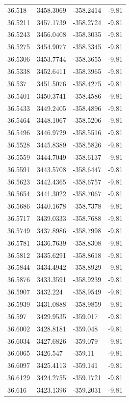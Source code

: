 \begin{table}[H]
\begin{tabular}{llll}
36.518 & 3458.3069 & -358.2414 & -9.81 \\
36.5211 & 3457.1739 & -358.2724 & -9.81 \\
36.5243 & 3456.0408 & -358.3035 & -9.81 \\
36.5275 & 3454.9077 & -358.3345 & -9.81 \\
36.5306 & 3453.7744 & -358.3655 & -9.81 \\
36.5338 & 3452.6411 & -358.3965 & -9.81 \\
36.537 & 3451.5076 & -358.4275 & -9.81 \\
36.5401 & 3450.3741 & -358.4586 & -9.81 \\
36.5433 & 3449.2405 & -358.4896 & -9.81 \\
36.5464 & 3448.1067 & -358.5206 & -9.81 \\
36.5496 & 3446.9729 & -358.5516 & -9.81 \\
36.5528 & 3445.8389 & -358.5826 & -9.81 \\
36.5559 & 3444.7049 & -358.6137 & -9.81 \\
36.5591 & 3443.5708 & -358.6447 & -9.81 \\
36.5623 & 3442.4365 & -358.6757 & -9.81 \\
36.5654 & 3441.3022 & -358.7067 & -9.81 \\
36.5686 & 3440.1678 & -358.7378 & -9.81 \\
36.5717 & 3439.0333 & -358.7688 & -9.81 \\
36.5749 & 3437.8986 & -358.7998 & -9.81 \\
36.5781 & 3436.7639 & -358.8308 & -9.81 \\
36.5812 & 3435.6291 & -358.8618 & -9.81 \\
36.5844 & 3434.4942 & -358.8929 & -9.81 \\
36.5876 & 3433.3591 & -358.9239 & -9.81 \\
36.5907 & 3432.224 & -358.9549 & -9.81 \\
36.5939 & 3431.0888 & -358.9859 & -9.81 \\
36.597 & 3429.9535 & -359.017 & -9.81 \\
36.6002 & 3428.8181 & -359.048 & -9.81 \\
36.6034 & 3427.6826 & -359.079 & -9.81 \\
36.6065 & 3426.547 & -359.11 & -9.81 \\
36.6097 & 3425.4113 & -359.141 & -9.81 \\
36.6129 & 3424.2755 & -359.1721 & -9.81 \\
36.616 & 3423.1396 & -359.2031 & -9.81 \\

\end{tabular}
\end{table}
